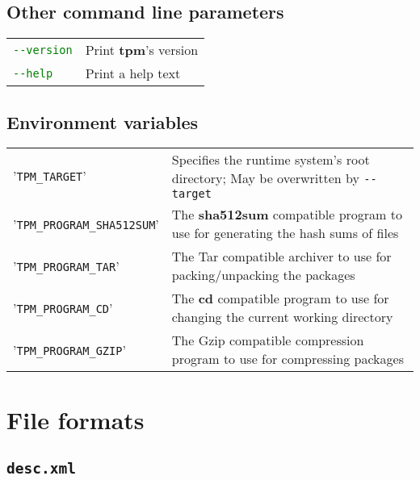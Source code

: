 \documentclass[a4paper]{article}
\newcommand{\file}[1]{\texttt{#1}}
\newcommand{\program}[1]{\textbf{#1}}
\newcommand{\variable}[1]{'\texttt{#1}'}
\newcommand{\green}[1]{\textcolor{green}{#1}}
\begin{document}
	\subsection{Other command line parameters}
	\label{sec:other_command_line_parameters}
	
	\bgroup
	\def\arraystretch{1.5}
	\begin{tabularx}{\textwidth}{lX}
		\green{\texttt{-{}-version}} & Print \program{tpm}'s version \\
		\green{\texttt{-{}-help}} & Print a help text
	\end{tabularx}
	\egroup
	
	\subsection{Environment variables}
	\label{sec:environment_variables}
	
	\bgroup
	\def\arraystretch{1.5}
	\begin{tabularx}{\textwidth}{lX}
		\variable{TPM\_TARGET} & Specifies the runtime system's root directory; May be overwritten by \texttt{-{}-target} \\
		
		\variable{TPM\_PROGRAM\_SHA512SUM} & The \program{sha512sum} compatible program to use for generating the hash sums of files \\
		
		\variable{TPM\_PROGRAM\_TAR} & The Tar compatible archiver to use for packing/unpacking the packages \\
		
		\variable{TPM\_PROGRAM\_CD} & The \program{cd} compatible program to use for changing the current working directory \\
		
		\variable{TPM\_PROGRAM\_GZIP} & The Gzip compatible compression program to use for compressing packages \\
	\end{tabularx}
	\egroup
	
	\section{File formats}
	\label{sec:file_formats}
	
	\subsection{\file{desc.xml}}
	\label{sec:desc.xml}
	
\end{document}
